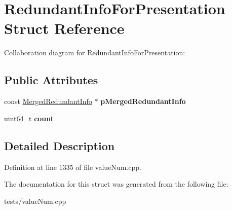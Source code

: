 \hypertarget{structRedundantInfoForPresentation}{\section{Redundant\-Info\-For\-Presentation Struct Reference}
\label{structRedundantInfoForPresentation}
}


Collaboration diagram for Redundant\-Info\-For\-Presentation\-:
\subsection*{Public Attributes}
\begin{DoxyCompactItemize}
\item 
\hypertarget{structRedundantInfoForPresentation_aee93cc1e1742c5245983669816880a81}{const \hyperlink{structMergedRedundantInfo}{Merged\-Redundant\-Info} $\ast$ {\bfseries p\-Merged\-Redundant\-Info}}\label{structRedundantInfoForPresentation_aee93cc1e1742c5245983669816880a81}

\item 
\hypertarget{structRedundantInfoForPresentation_acf63bf4fe95e235880ad949ee87756ce}{uint64\-\_\-t {\bfseries count}}\label{structRedundantInfoForPresentation_acf63bf4fe95e235880ad949ee87756ce}

\end{DoxyCompactItemize}


\subsection{Detailed Description}


Definition at line 1335 of file value\-Num.\-cpp.



The documentation for this struct was generated from the following file\-:\begin{DoxyCompactItemize}
\item 
tests/value\-Num.\-cpp\end{DoxyCompactItemize}
